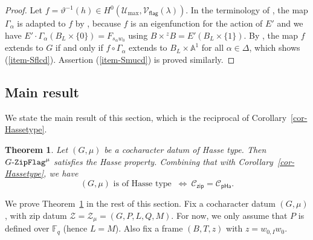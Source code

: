 \documentclass[11pt]{amsart}
\numberwithin{equation}{section}
\newtheorem{theorem}{Theorem}[section]
\theoremstyle{definition}
\theoremstyle{remark}
\newcommand{\pha}{\mathsf{pHa}}
\newcommand{\zipsf}{\mathsf{zip}}
\newcommand{\flag}{\mathsf{flag}}
\newcommand{\GF}{\mathop{\text{$G$-{\tt ZipFlag}}}\nolimits}
\newcommand{\Ccal}{{\mathcal C}}
\newcommand{\Ucal}{{\mathcal U}}
\newcommand{\Vcal}{{\mathcal V}}
\newcommand{\Zcal}{{\mathcal Z}}
\renewcommand{\AA}{\mathbb{A}}
\newcommand{\FF}{\mathbb{F}}
\begin{document}
\begin{proof}
Let $f=\vartheta^{-1}(h)\in H^0(\Ucal_{\max}, \Vcal_{\flag}(\lambda))$. In the terminology of \cite[Definition 3.2.1]{Koskivirta-automforms-GZip}, the map $\Gamma_\alpha$ is adapted to $f$ by \cite[Lemma 3.2.4]{Koskivirta-automforms-GZip}, 
because $f$ is an eigenfunction for the action of $E'$ and we have $E'\cdot \Gamma_\alpha(B_L\times \{0\})= F_{s_\alpha w_0}$ using $B\times {}^zB = E' (B_L\times \{1\})$. By \cite[Lemma 3.2.2]{Koskivirta-automforms-GZip}, the map $f$ extends to $G$ if and only if $f\circ \Gamma_{\alpha}$ extends to $B_L\times \AA^1$ for all $\alpha\in \Delta$, which shows (\ref{item-Sflcd}). Assertion (\ref{item-Smucd}) is proved similarly.
\end{proof}



\subsection{Main result} \label{sec-main-result}

We state the main result of this section, which is the reciprocal of Corollary~\ref{cor-Hassetype}. 

\begin{theorem}\label{main-thm-Hasse-type}
Let $(G,\mu)$ be a cocharacter datum of Hasse type. Then $\GF^\mu$ satisfies the Hasse property. Combining that with Corollary~\ref{cor-Hassetype}, we have 
\begin{equation}
(G,\mu) \textrm{ is of Hasse type } \ \Longleftrightarrow \ \Ccal_{\zipsf} = \Ccal_{\pha}.
\end{equation}
\end{theorem}

We prove Theorem~\ref{main-thm-Hasse-type} in the rest of this section. Fix a cocharacter datum $(G,\mu)$, with zip datum $\Zcal=\Zcal_\mu=(G,P,L,Q,M)$. For now, we only assume that $P$ is defined over $\FF_q$ (hence $L=M$). Also fix  a frame $(B,T,z)$ with $z=w_{0,I}w_0$.
\end{document}
